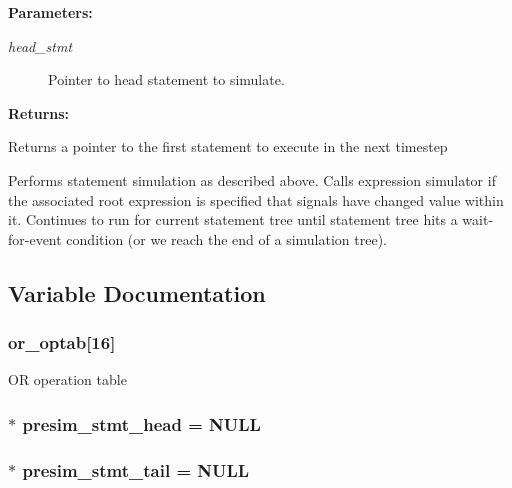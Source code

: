 \begin{Desc}
\item[{\bf Parameters: }]\par
\begin{description}
\item[
{\em head\_\-stmt}]Pointer to head statement to simulate.

\end{description}
\end{Desc}
\begin{Desc}
\item[{\bf Returns: }]\par
Returns a pointer to the first statement to execute in the next timestep

\end{Desc}
Performs statement simulation as described above. Calls expression simulator if the associated root expression is specified that signals have changed value within it. Continues to run for current statement tree until statement tree hits a wait-for-event condition (or we reach the end of a simulation tree). 

\subsection{Variable Documentation}
\subsubsection{ or\_\-optab[16]}\label{sim_8c_a0}


OR operation table 
\subsubsection{ $\ast$ presim\_\-stmt\_\-head = NULL}\label{sim_8c_a3}


\subsubsection{ $\ast$ presim\_\-stmt\_\-tail = NULL}\label{sim_8c_a4}


